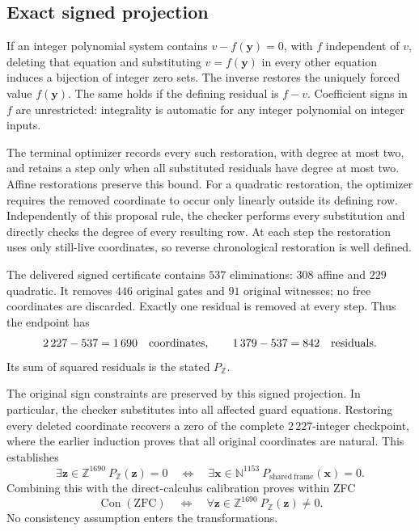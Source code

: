 \subsection{Exact signed projection}

If an integer polynomial system contains $v-f(\mathbf y)=0$, with $f$
independent of $v$, deleting that equation and substituting
$v=f(\mathbf y)$ in every other equation induces a bijection of integer
zero sets.  The inverse restores the uniquely forced value $f(\mathbf y)$.
The same holds if the defining residual is $f-v$.  Coefficient signs in
$f$ are unrestricted: integrality is automatic for any integer
polynomial on integer inputs.

The terminal optimizer records every such restoration, with degree at
most two, and retains a step only when all substituted residuals have
degree at most two.  Affine restorations preserve this bound.  For a
quadratic restoration, the optimizer requires the removed coordinate to
occur only linearly outside its defining row.  Independently of this
proposal rule, the checker performs every substitution and directly
checks the degree of every resulting row.  At each step the restoration
uses only still-live coordinates, so reverse chronological restoration
is well defined.

The delivered signed certificate contains $537$ eliminations: $308$
affine and $229$ quadratic.  It removes $446$ original gates and $91$
original witnesses; no free coordinates are discarded.  Exactly one
residual is removed at every step.  Thus the endpoint has
\[
 2\,227-537=1\,690\quad\hbox{coordinates},\qquad
 1\,379-537=842\quad\hbox{residuals}.
\]
Its sum of squared residuals is the stated $P_{\mathbb Z}$.

The original sign constraints are preserved by this signed projection.
In particular, the checker substitutes into all affected guard equations.
Restoring every deleted coordinate recovers a zero of the complete
$2\,227$-integer checkpoint, where the earlier induction proves that all
original coordinates are natural.  This establishes
\[
 \exists\mathbf z\in\mathbb Z^{1690}\ P_{\mathbb Z}(\mathbf z)=0
 \quad\Longleftrightarrow\quad
 \exists\mathbf x\in\mathbb N^{1153}\ P_{\mathrm{shared\ frame}}(\mathbf x)=0.
\]
Combining this with the direct-calculus calibration proves within ZFC
\[
 \operatorname{Con}(\mathrm{ZFC})
 \quad\Longleftrightarrow\quad
 \forall\mathbf z\in\mathbb Z^{1690}\ P_{\mathbb Z}(\mathbf z)\ne0.
\]
No consistency assumption enters the transformations.

